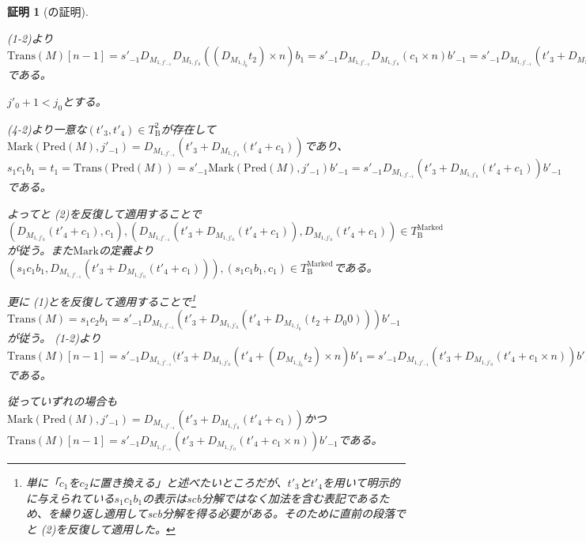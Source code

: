 \documentclass[dvipdfmx,uplatex]{jsarticle}
\theoremstyle{customnonumberbreakfortheorem}
\theoremstyle{customnonumberbreakforproof}
\newtheorem{hideableproof}{証明}
\begin{document}
\begin{hideableproof}[の証明]
\begin{indented}
\begin{indented}
\begin{indented}
\begin{indented}
					\item {} (1-2)より\(\textrm{Trans}(M)[n-1] = s'_{-1} D_{M_{1,j'_{-1}}} D_{M_{1,j'_0}}((D_{M_{1,j_0}} t_2) \times n) b_1 = s'_{-1} D_{M_{1,j'_{-1}}} D_{M_{1,j'_0}}(c_1 \times n) b'_{-1} = s'_{-1} D_{M_{1,j'_{-1}}}(t'_3 + D_{M_{1,j'_0}}(t'_4 + c_1 \times n)) b'_{-1}\)である。
				\end{indented}
				\item \(j'_0+1 < j_0\)とする。
				\begin{indented}
					\item {} (4-2)より一意な\((t'_3,t'_4) \in T_{\textrm{B}}^2\)が存在して\(\textrm{Mark}(\textrm{Pred}(M),j'_{-1}) = D_{M_{1,j'_{-1}}}(t'_3 + D_{M_{1,j'_0}}(t'_4+c_1))\)であり、\(s_1 c_1 b_1 = t_1 = \textrm{Trans}(\textrm{Pred}(M)) = s'_{-1} \textrm{Mark}(\textrm{Pred}(M),j'_{-1}) b'_{-1} = s'_{-1} D_{M_{1,j'_{-1}}}(t'_3 + D_{M_{1,j'_0}}(t'_4+c_1)) b'_{-1}\)である。
					\item よってと (2)を反復して適用することで\((D_{M_{1,j'_0}}(t'_4+c_1),c_1), (D_{M_{1,j'_{-1}}}(t'_3 + D_{M_{1,j'_0}}(t'_4+c_1)),D_{M_{1,j'_0}}(t'_4+c_1)) \in T_{\textrm{B}}^{\textrm{Marked}}\)が従う。また\(\textrm{Mark}\)の定義より\((s_1 c_1 b_1,D_{M_{1,j'_{-1}}}(t'_3 + D_{M_{1,j'_0}}(t'_4+c_1))), (s_1 c_1 b_1,c_1) \in T_{\textrm{B}}^{\textrm{Marked}}\)である。
					\item 更に (1)とを反復して適用することで\footnote{単に「\(c_1\)を\(c_2\)に置き換える」と述べたいところだが、\(t'_3\)と\(t'_4\)を用いて明示的に与えられている\(s_1 c_1 b_1\)の表示はscb分解ではなく加法を含む表記であるため、を繰り返し適用してscb分解を得る必要がある。そのために直前の段落でと (2)を反復して適用した。}\(\textrm{Trans}(M) = s_1 c_2 b_1 = s'_{-1} D_{M_{1,j'_{-1}}}(t'_3 + D_{M_{1,j'_0}}(t'_4 + D_{M_{1,j_0}}(t_2 + D_0 0))) b'_{-1}\)が従う。 (1-2)より\(\textrm{Trans}(M)[n-1] = s'_{-1} D_{M_{1,j'_{-1}}}(t'_3 + D_{M_{1,j'_0}}(t'_4 + (D_{M_{1,j_0}} t_2) \times n) b'_1 = s'_{-1} D_{M_{1,j'_{-1}}}(t'_3 + D_{M_{1,j'_0}}(t'_4 + c_1 \times n)) b'_{-1}\)である。
				\end{indented}
				\item 従っていずれの場合も\(\textrm{Mark}(\textrm{Pred}(M),j'_{-1}) = D_{M_{1,j'_{-1}}}(t'_3 + D_{M_{1,j'_0}}(t'_4+c_1))\)かつ\(\textrm{Trans}(M)[n-1] = s'_{-1} D_{M_{1,j'_{-1}}}(t'_3 + D_{M_{1,j'_0}}(t'_4 + c_1 \times n)) b'_{-1}\)である。

\end{indented}
\end{indented}
\end{indented}
\end{hideableproof}
\end{document}
